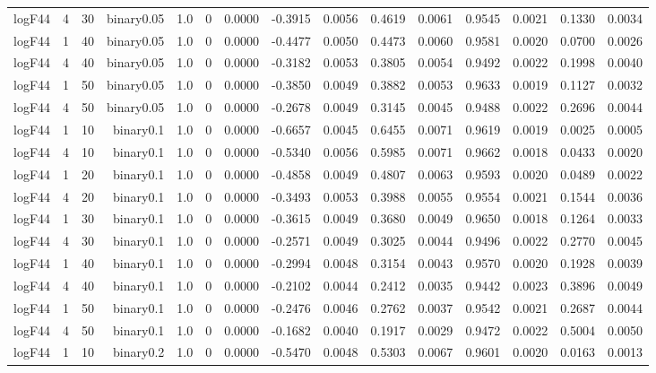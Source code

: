 \begin{longtable}{rrrrrrrrrrrrrrr}
  logF44 & 4 & 30 & binary0.05 & 1.0 & 0 & 0.0000 & -0.3915 & 0.0056 & 0.4619 & 0.0061 & 0.9545 & 0.0021 & 0.1330 & 0.0034 \\ 
  logF44 & 1 & 40 & binary0.05 & 1.0 & 0 & 0.0000 & -0.4477 & 0.0050 & 0.4473 & 0.0060 & 0.9581 & 0.0020 & 0.0700 & 0.0026 \\ 
  logF44 & 4 & 40 & binary0.05 & 1.0 & 0 & 0.0000 & -0.3182 & 0.0053 & 0.3805 & 0.0054 & 0.9492 & 0.0022 & 0.1998 & 0.0040 \\ 
  logF44 & 1 & 50 & binary0.05 & 1.0 & 0 & 0.0000 & -0.3850 & 0.0049 & 0.3882 & 0.0053 & 0.9633 & 0.0019 & 0.1127 & 0.0032 \\ 
  logF44 & 4 & 50 & binary0.05 & 1.0 & 0 & 0.0000 & -0.2678 & 0.0049 & 0.3145 & 0.0045 & 0.9488 & 0.0022 & 0.2696 & 0.0044 \\ 
  logF44 & 1 & 10 & binary0.1 & 1.0 & 0 & 0.0000 & -0.6657 & 0.0045 & 0.6455 & 0.0071 & 0.9619 & 0.0019 & 0.0025 & 0.0005 \\ 
  logF44 & 4 & 10 & binary0.1 & 1.0 & 0 & 0.0000 & -0.5340 & 0.0056 & 0.5985 & 0.0071 & 0.9662 & 0.0018 & 0.0433 & 0.0020 \\ 
  logF44 & 1 & 20 & binary0.1 & 1.0 & 0 & 0.0000 & -0.4858 & 0.0049 & 0.4807 & 0.0063 & 0.9593 & 0.0020 & 0.0489 & 0.0022 \\ 
  logF44 & 4 & 20 & binary0.1 & 1.0 & 0 & 0.0000 & -0.3493 & 0.0053 & 0.3988 & 0.0055 & 0.9554 & 0.0021 & 0.1544 & 0.0036 \\ 
  logF44 & 1 & 30 & binary0.1 & 1.0 & 0 & 0.0000 & -0.3615 & 0.0049 & 0.3680 & 0.0049 & 0.9650 & 0.0018 & 0.1264 & 0.0033 \\ 
  logF44 & 4 & 30 & binary0.1 & 1.0 & 0 & 0.0000 & -0.2571 & 0.0049 & 0.3025 & 0.0044 & 0.9496 & 0.0022 & 0.2770 & 0.0045 \\ 
  logF44 & 1 & 40 & binary0.1 & 1.0 & 0 & 0.0000 & -0.2994 & 0.0048 & 0.3154 & 0.0043 & 0.9570 & 0.0020 & 0.1928 & 0.0039 \\ 
  logF44 & 4 & 40 & binary0.1 & 1.0 & 0 & 0.0000 & -0.2102 & 0.0044 & 0.2412 & 0.0035 & 0.9442 & 0.0023 & 0.3896 & 0.0049 \\ 
  logF44 & 1 & 50 & binary0.1 & 1.0 & 0 & 0.0000 & -0.2476 & 0.0046 & 0.2762 & 0.0037 & 0.9542 & 0.0021 & 0.2687 & 0.0044 \\ 
  logF44 & 4 & 50 & binary0.1 & 1.0 & 0 & 0.0000 & -0.1682 & 0.0040 & 0.1917 & 0.0029 & 0.9472 & 0.0022 & 0.5004 & 0.0050 \\ 
  logF44 & 1 & 10 & binary0.2 & 1.0 & 0 & 0.0000 & -0.5470 & 0.0048 & 0.5303 & 0.0067 & 0.9601 & 0.0020 & 0.0163 & 0.0013 \\ 

\end{longtable}
